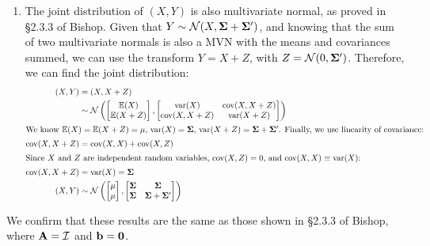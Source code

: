\documentclass[submit]{harvardml}
\newcommand{\E}{\mathbb{E}}
\newcommand{\cov}{\text{cov}}
\begin{document}
\begin{enumerate}
\item
  The joint distribution of $(X,Y)$ is also multivariate normal, as
  proved in \S2.3.3 of Bishop. Given that
  $Y\sim\mathcal{N}(X,\boldsymbol{\Sigma}+\boldsymbol{\Sigma}^\prime)$, and knowing that the sum of
  two multivariate normals is also a MVN with the means and
  covariances summed, we can use the transform $Y = X + Z$, with
  $Z=\mathcal{N}(0,\boldsymbol{\Sigma}^\prime)$. Therefore, we can find the joint distribution:
  \begin{align*}
    (X,Y) &= (X, X+Z)\\
    &\sim \mcN\left(\begin{bmatrix}\E(X)\\\E(X+Z)
    \end{bmatrix}, \begin{bmatrix}\var(X)&\cov(X,X+Z)\\
      \cov(X,X+Z)&\var(X+Z)
    \end{bmatrix}\right)\\
    \intertext{We know $\E(X) = \E(X+Z) = \mu$, $\var(X) = \bSigma$,
      $\var(X+Z) = \bSigma + \bSigma^\prime$. Finally, we use
      linearity of covariance:}
    \cov(X,X+Z) &= \cov(X,X) + \cov(X,Z)\\
    \intertext{Since $X$ and $Z$ are independent random variables,
      $\cov(X,Z) = 0$, and $\cov(X,X) \equiv \var(X)$:}
    \cov(X,X+Z) &= \var(X) = \bSigma\\
   (X,Y) &\sim \mcN\left(\begin{bmatrix}\mu\\\mu
    \end{bmatrix}, \begin{bmatrix}\bSigma&\bSigma\\
      \bSigma&\bSigma+\bSigma^\prime \end{bmatrix}\right)
  \end{align*}
\end{enumerate}

We confirm that these results are the same as those shown in \S2.3.3
of Bishop, where $\mathbf{A}=\mathcal{I}$ and $\mathbf{b} = \mathbf{0}$.

\newpage
\end{document}
